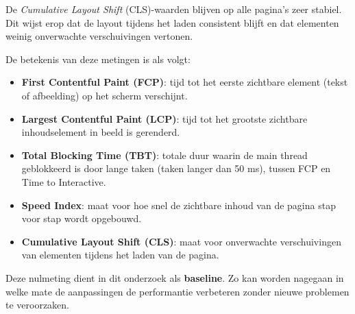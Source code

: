 De \textit{Cumulative Layout Shift} (CLS)-waarden blijven op alle pagina’s zeer stabiel. Dit wijst erop dat de layout tijdens het laden consistent blijft en dat elementen weinig onverwachte verschuivingen vertonen.

De betekenis van deze metingen is als volgt:

\begin{itemize}
\item \textbf{First Contentful Paint (FCP)}: tijd tot het eerste zichtbare element (tekst of afbeelding) op het scherm verschijnt.
\item \textbf{Largest Contentful Paint (LCP)}: tijd tot het grootste zichtbare inhoudselement in beeld is gerenderd.
\item \textbf{Total Blocking Time (TBT)}: totale duur waarin de main thread geblokkeerd is door lange taken (taken langer dan 50 ms), tussen FCP en Time to Interactive.
\item \textbf{Speed Index}: maat voor hoe snel de zichtbare inhoud van de pagina stap voor stap wordt opgebouwd.
\item \textbf{Cumulative Layout Shift (CLS)}: maat voor onverwachte verschuivingen van elementen tijdens het laden van de pagina.
\end{itemize}

Deze nulmeting dient in dit onderzoek als \textbf{baseline}. Zo kan worden nagegaan in welke mate de aanpassingen de performantie verbeteren zonder nieuwe problemen te veroorzaken.



